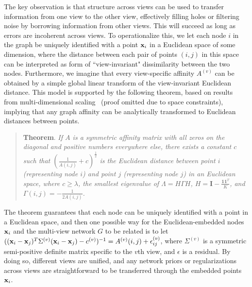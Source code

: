 
The key observation is that structure across views can be used to transfer information from one view to the other view, effectively filling holes or filtering noise by borrowing information from other views. This will succeed as long as errors are incoherent across views. To operationalize this, we let each node $i$ in the graph be uniquely identified with a point ${\bf x}_i$ in a Euclidean space of some dimension, where the distance between each pair of points $(i,j)$ in this space can be interpreted as form of ``view-invariant" dissimilarity between the two nodes. Furthermore, we imagine that every view-specific affinity $A^{(v)}$ can be obtained by a simple global linear transform of the view-invariant Euclidean distance. This model is supported by the following theorem, based on results from multi-dimensional scaling~\cite{CoxMDS} (proof omitted due to space constraints), implying that any graph affinity can be analytically transformed to Euclidean distances between points.

\begin{quote}
\textbf{Theorem}. \textit{If $A$ is a symmetric affinity matrix with all zeros on the diagonal and positive numbers everywhere else, there exists a constant $c$ such that $(\frac{1}{A(i,j)}+c)^{\frac{1}{2}}$ is the Euclidean distance between point $i$ (representing node $i$) and point $j$ (representing node $j$) in an Euclidean space, where $c\geq\lambda$, the smallest eigenvalue of $\Lambda=H\Gamma H$, $H=\mathbf{I}-\frac{\mathbf{1}\mathbf{1}^T}{K}$, and $\Gamma(i,j)=-\frac{1}{2A(i,j)}$.} 
\end{quote}

The theorem guarantees that each node can be uniquely identified with a point in a Euclidean space, and then one possible way for the Euclidean-embedded nodes ${\bf x}_i$ and the multi-view network $G$ to be related is to let $(({\bf x}_i-{\bf x}_j)^{T}\Sigma^{(v)}({\bf x}_i-{\bf x}_j)-c^{(v)})^{-1}=A^{(v)}(i,j)+\epsilon^{(v)}_{ij}$, where $\Sigma^{(v)}$ is a symmetric semi-positive definite matrix specific to the $v$th view, and $\epsilon$ is a residual. By doing so, different views are unified, and any network priors or regularizations across views are straightforward to be transferred through the embedded points ${\bf x}_i$. 

